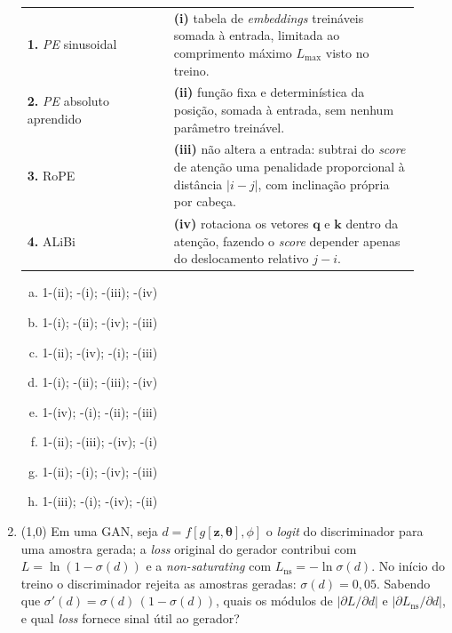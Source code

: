 \documentclass[11pt,a4paper]{article}
\newcommand{\thetav}{\boldsymbol{\theta}}
\begin{document}
\begin{enumerate}[1)]
\begin{center}
\begin{tabular}{p{0.34\linewidth} p{0.58\linewidth}}
\textbf{1.} \textit{PE} sinusoidal & \textbf{(i)} tabela de \textit{embeddings} treináveis somada à entrada, limitada ao comprimento máximo $L_{\text{max}}$ visto no treino. \\
\textbf{2.} \textit{PE} absoluto aprendido & \textbf{(ii)} função fixa e determinística da posição, somada à entrada, sem nenhum parâmetro treinável. \\
\textbf{3.} RoPE & \textbf{(iii)} não altera a entrada: subtrai do \textit{score} de atenção uma penalidade proporcional à distância $|i - j|$, com inclinação própria por cabeça. \\
\textbf{4.} ALiBi & \textbf{(iv)} rotaciona os vetores $\mathbf{q}$ e $\mathbf{k}$ dentro da atenção, fazendo o \textit{score} depender apenas do deslocamento relativo $j - i$. \\
\end{tabular}
\end{center}

\begin{enumerate}[a)]
    \item 1-(ii); -(i); -(iii); -(iv)
    \item 1-(i); -(ii); -(iv); -(iii)
    \item 1-(ii); -(iv); -(i); -(iii)
    \item 1-(i); -(ii); -(iii); -(iv)
    \item 1-(iv); -(i); -(ii); -(iii)
    \item 1-(ii); -(iii); -(iv); -(i)
    \item 1-(ii); -(i); -(iv); -(iii)
    \item 1-(iii); -(i); -(iv); -(ii)
\end{enumerate}

\item (1{,}0) Em uma GAN, seja $d = f[g[\mathbf{z},\thetav],\phi]$ o \textit{logit} do discriminador para uma amostra gerada; a \textit{loss} original do gerador contribui com $L = \ln(1 - \sigma(d))$ e a \textit{non-saturating} com $L_{\text{ns}} = -\ln \sigma(d)$. No início do treino o discriminador rejeita as amostras geradas: $\sigma(d) = 0{,}05$. Sabendo que $\sigma'(d) = \sigma(d)\,(1 - \sigma(d))$, quais os módulos de $\left|\partial L / \partial d\right|$ e $\left|\partial L_{\text{ns}} / \partial d\right|$, e qual \textit{loss} fornece sinal útil ao gerador?


\end{enumerate}
\end{document}
